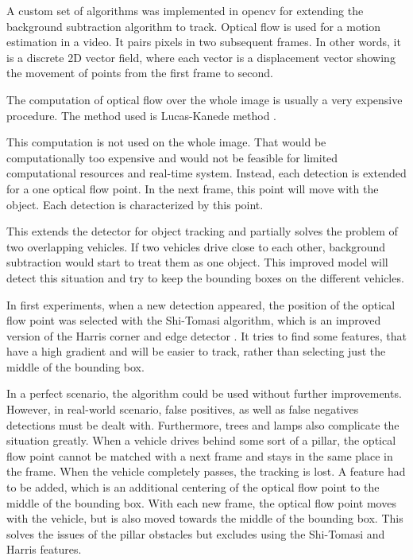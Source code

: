 \documentclass[a4paper,11pt,titlepage,twoside]{article}
\numberwithin{figure}{section}
\begin{document}
A custom set of algorithms was implemented in opencv\cite{opencv} for extending the background subtraction algorithm to track. Optical flow \cite{optical-flow} is used for a motion estimation in a video. It pairs pixels in two subsequent frames. In other words, it is a discrete 2D vector field, where each vector is a displacement vector showing the movement of points from the first frame to second.

The computation of optical flow over the whole image is usually a very expensive procedure. The method used is Lucas-Kanede method \cite{lucas-kanede}. 

This computation is not used on the whole image. That would be computationally too expensive and would not be feasible for limited computational resources and real-time system. Instead, each detection is extended for a one optical flow point. In the next frame, this point will move with the object. Each detection is characterized by this point. 

This extends the detector for object tracking and partially solves the problem of two overlapping vehicles. If two vehicles drive close to each other, background subtraction would start to treat them as one object. This improved model will detect this situation and try to keep the bounding boxes on the different vehicles. 

In first experiments, when a new detection appeared, the position of the optical flow point was selected with the Shi-Tomasi \cite{shi-tomasi} algorithm, which is an improved version of the Harris corner and edge detector \cite{harris}. It tries to find some features, that have a high gradient and will be easier to track, rather than selecting just the middle of the bounding box.

In a perfect scenario, the algorithm could be used without further improvements. However, in real-world scenario, false positives, as well as false negatives detections must be dealt with. Furthermore, trees and lamps also complicate the situation greatly. When a vehicle drives behind some sort of a pillar, the optical flow point cannot be matched with a next frame and stays in the same place in the frame. When the vehicle completely passes, the tracking is lost. A feature had to be added, which is an additional centering of the optical flow point to the middle of the bounding box. With each new frame, the optical flow point moves with the vehicle, but is also moved towards the middle of the bounding box. This solves the issues of the pillar obstacles but excludes using the Shi-Tomasi and Harris features. 
\end{document}
